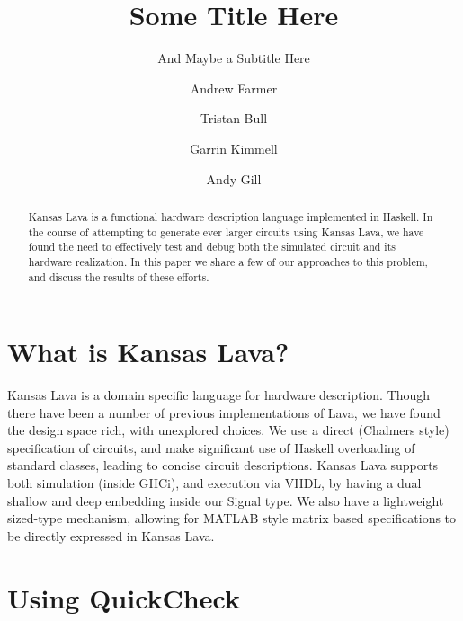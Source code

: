 \documentclass{llncs}
\begin{document}
\title{Some Title Here}
\subtitle{And Maybe a Subtitle Here}

\author{Andrew Farmer \and Tristan Bull \and Garrin Kimmell \and Andy Gill}


\maketitle

\begin{abstract}
Kansas Lava is a functional hardware description language implemented
in Haskell. In the course of attempting to generate ever larger circuits
using Kansas Lava, we have found the need to effectively test and debug
both the simulated circuit and its hardware realization. In this paper
we share a few of our approaches to this problem, and discuss the
results of these efforts.
\end{abstract}

\section{What is Kansas Lava?}

Kansas Lava is a domain specific language for hardware description.
Though there have been a number of previous implementations
of Lava, we have found the design space rich, with unexplored choices.
We use a direct (Chalmers style) specification of circuits, and make
significant use of Haskell overloading of standard classes, leading to
concise circuit descriptions. Kansas Lava supports both simulation (inside
GHCi), and execution via VHDL, by having a dual shallow and deep
embedding inside our Signal type. We also have a lightweight sized-type
mechanism, allowing for MATLAB style matrix based specifications to
be directly expressed in Kansas Lava.

\section{Using QuickCheck}
\end{document}
